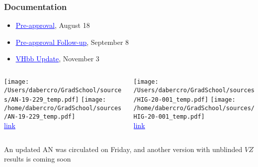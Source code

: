 \documentclass{beamer}
\newcommand{\link}[2]{\href{#2}{\textcolor{blue}{\underline{#1}}}}
\begin{document}
\begin{frame}
  \frametitle{Documentation}

  \begin{itemize}
  \item \link{Pre-approval}{https://indico.cern.ch/event/943906/#14-pre-approval-of-hig-20-001}, August 18
  \item \link{Pre-approval Follow-up}{https://indico.cern.ch/event/943919/#6-vh-hbb-update}, September 8
  \item \link{VHbb Update}{https://indico.cern.ch/event/961164/#6-vhbb-hig-20-001-status}, November 3
  \end{itemize}
  
  \begin{columns}
    \begin{column}{0.5\linewidth}
      \centering
                   {\texttt{[image: /Users/dabercro/GradSchool/sources/AN-19-229\_temp.pdf]}}
                   {\texttt{[image: /home/dabercro/GradSchool/sources/AN-19-229\_temp.pdf]}} \\
                   \link{link}{http://cms.cern.ch/iCMS/jsp/db_notes/noteInfo.jsp?cmsnoteid=CMS\%20AN-2019/229}
    \end{column}
    \begin{column}{0.5\linewidth}
      \centering
                   {\texttt{[image: /Users/dabercro/GradSchool/sources/HIG-20-001\_temp.pdf]}}
                   {\texttt{[image: /home/dabercro/GradSchool/sources/HIG-20-001\_temp.pdf]}} \\
                   \link{link}{http://cms.cern.ch/iCMS/jsp/db_notes/noteInfo.jsp?cmsnoteid=CMS\%20AN-2020/145}
    \end{column}
  \end{columns}

  \vfill
  An updated AN was circulated on Friday, and another version with unblinded $V\!Z$ results is coming soon

\end{frame}
\end{document}
